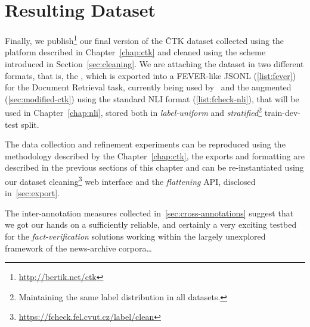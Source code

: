 \section{Resulting Dataset}
Finally, we publish\footnote{\url{http://bertik.net/ctk}} our final version of the \textsf{ČTK} dataset collected using the platform described in Chapter~\ref{chap:ctk} and cleaned using the scheme introduced in Section~\ref{sec:cleaning}. We are attaching the dataset in two different formats, that is, the {}, which is exported into a \textsf{FEVER}-like \textsf{JSONL} (\ref{list:fever}) for the Document Retrieval task, currently being used by~\cite{rypar} and the augmented (\ref{sec:modified-ctk}) {} using the standard NLI format (\ref{list:fcheck-nli}), that will be used in Chapter~\ref{chap:nli}, stored both in \textit{label-uniform} and \textit{stratified}\footnote{Maintaining the same label distribution in all datasets.} \textsf{train-dev-test} split.

\label{sec:dataset-latest}


\label{sec:fever_result}
\begin{table}[H]
\caption[Label distribution in our \textsf{ČTKv2.1} dataset]{Label distribution in our \textsf{ČTK v2.1} dataset (with forced label uniformity in the validation sets to remove advantage for heavily biased predictors) and in our \textsf{ČTK v2.1nli} uniform and stratified splits}
\label{tab:ctk21}
\end{table}

The data collection and refinement experiments can be reproduced using the methodology described by the Chapter~\ref{chap:ctk}, the exports and formatting are described in the previous sections of this chapter and can be re-instantiated using our dataset cleaning\footnote{\url{https://fcheck.fel.cvut.cz/label/clean}} web interface and the \textit{flattening} \textsf{API}, disclosed in~\ref{sec:export}. 

The inter-annotation measures collected in~\ref{sec:cross-annotations} suggest that we got our hands on a sufficiently reliable, and certainly a very exciting testbed for the \textit{fact-verification} solutions working within the largely unexplored framework of the news-archive corpora\dots
